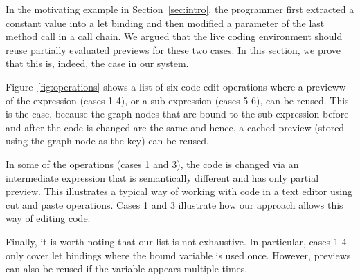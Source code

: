 \documentclass[sigplan,10pt,review,anonymous]{acmart}\settopmatter{printfolios=true,printccs=false,printacmref=false}
\theoremstyle{plain}
\theoremstyle{definition}
\begin{document}
In the motivating example in Section~\ref{sec:intro}, the programmer first extracted a constant
value into a let binding and then modified a parameter of the last method call in a call chain.
We argued that the live coding environment should reuse partially evaluated previews for these
two cases. In this section, we prove that this is, indeed, the case in our system.

Figure~\ref{fig:operations} shows a list of six code edit operations where a previeww of the 
expression (cases 1-4), or a sub-expression (cases 5-6), can be reused. This is the case, because 
the graph nodes that are bound to the sub-expression before and after the code is changed are the 
same and hence, a cached preview (stored using the graph node as the key) can be reused.

In some of the operations (cases 1 and 3), the code is changed via an intermediate expression
that is semantically different and has only partial preview. This illustrates a typical way of
working with code in a text editor using cut and paste operations. Cases 1 and 3 illustrate how
our approach allows this way of editing code.

Finally, it is worth noting that our list is not exhaustive. In particular, cases 1-4 only cover
let bindings where the bound variable is used once. However, previews can also be reused if the
variable appears multiple times.

\end{document}
